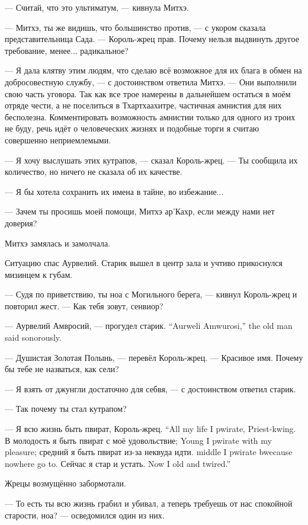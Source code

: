 --- Считай, что это ультиматум, --- кивнула Митхэ.

--- Митхэ, ты же видишь, что большинство против, --- с укором сказала представительница Сада.
--- Король-жрец прав.
Почему нельзя выдвинуть другое требование, менее... радикальное?

--- Я дала клятву этим людям, что сделаю всё возможное для их блага в обмен на добросовестную службу, --- с достоинством ответила Митхэ.
--- Они выполнили свою часть уговора.
Так как все трое намерены в дальнейшем остаться в моём отряде чести, а не поселиться в Тхартхаахитре, частичная амнистия для них бесполезна.
Комментировать возможность амнистии только для одного из троих не буду, речь идёт о человеческих жизнях и подобные торги я считаю совершенно неприемлемыми.

--- Я хочу выслушать этих кутрапов, --- сказал Король-жрец.
--- Ты сообщила их количество, но ничего не сказала об их качестве.

--- Я бы хотела сохранить их имена в тайне, во избежание...

--- Зачем ты просишь моей помощи, Митхэ ар'Кахр, если между нами нет доверия?

Митхэ замялась и замолчала.

Ситуацию спас Аурвелий.
Старик вышел в центр зала и учтиво прикоснулся мизинцем к губам.

--- Судя по приветствию, ты ноа с Могильного берега, --- кивнул Король-жрец и повторил жест.
--- Как тебя зовут, сенвиор?

{--- Аурвелий Амвросий, --- прогудел старик.}
{``Aurweli Amwurosi,'' the old man said sonorously.}

--- Душистая Золотая Полынь, --- перевёл Король-жрец.
--- Красивое имя.
Почему бы тебе не назваться, как сели?

--- Я взять от джунгли достаточно для себвя, --- с достоинством ответил старик.

--- Так почему ты стал кутрапом?

{--- Я всю жизнь быть пвират, Король-жрец.}
{``All my life I pwirate, Priest-kwing.}
{В молодость я быть пвират с моё удовольствие;}
{Young I pwirate with my pleasure;}
{средний я быть пвират из-за неквуда идти.}
{middle I pwirate bwecause nowhere go to.}
{Сейчас я стар и устать.}
{Now I old and twired.''}

Жрецы возмущённо забормотали.

--- То есть ты всю жизнь грабил и убивал, а теперь требуешь от нас спокойной старости, ноа? --- осведомился один из них.

